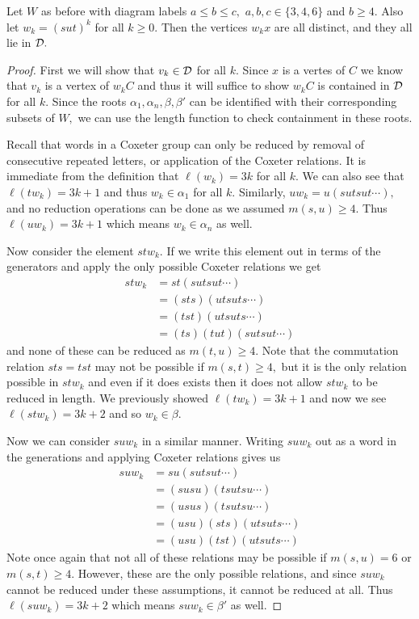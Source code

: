 \documentclass[class=book, crop=false,12 pt]{standalone}
\begin{document}
\begin{lemma}
	\label{infmany}
	Let $W$ as before with diagram labels $a\le b\le c,$ $a,b,c\in \{3,4,6\}$ and $b\ge 4.$ Also let $w_k=(sut)^k$ for all $k\ge 0.$ Then the vertices $w_kx$ are all distinct, and they all lie in $\mathcal{D}.$
\end{lemma}
\begin{proof}
	First we will show that $v_k\in \mathcal{D}$ for all $k.$ Since $x$ is a vertes of $C$ we know that $v_k$ is a vertex of $w_kC$ and thus it will suffice to show $w_kC$ is contained in $\mathcal{D}$ for all $k.$ Since the roots $\alpha_1,\alpha_n,\beta,\beta'$ can be identified with their corresponding subsets of $W,$ we can use the length function to check containment in these roots.

	Recall that words in a Coxeter group can only be reduced by removal of consecutive repeated letters, or application of the Coxeter relations. It is immediate from the definition that $\ell(w_k)=3k$ for all $k.$ We can also see that $\ell(tw_k)=3k+1$ and thus $w_k\in \alpha_1$ for all $k.$ Similarly, $uw_k=u(sutsut\cdots),$ and no reduction operations can be done as we assumed $m(s,u)\ge 4.$ Thus $\ell(uw_k)=3k+1$ which means $w_k\in \alpha_n$ as well.

	Now consider the element $stw_k.$ If we write this element out in terms of the generators and apply the only possible Coxeter relations we get
	\begin{align*}
		stw_k&=st(sutsut\cdots)\\
		     &=(sts)(utsuts\cdots)\\
		     &=(tst)(utsuts\cdots)\\
		     &=(ts)(tut)(sutsut\cdots)
	\end{align*}
	and none of these can be reduced as $m(t,u)\ge 4.$ Note that the commutation relation $sts=tst$ may not be possible if $m(s,t)\ge 4,$ but it is the only relation possible in $stw_k$ and even if it does exists then it does not allow $stw_k$ to be reduced in length. We previously showed $\ell(tw_k)=3k+1$ and now we see $\ell(stw_k)=3k+2$ and so $w_k\in \beta.$

	Now we can consider $suw_k$ in a similar manner. Writing $suw_k$ out as a word in the generations and applying Coxeter relations gives us
\begin{align*}
	suw_k&=su(sutsut\cdots)\\
	     &=(susu)(tsutsu\cdots)\\
	     &=(usus)(tsutsu\cdots)\\
	     &=(usu)(sts)(utsuts\cdots)\\
	     &=(usu)(tst)(utsuts\cdots)
\end{align*}
Note once again that not all of these relations may be possible if $m(s,u)=6$ or $m(s,t)\ge 4.$ However, these are the only possible relations, and since $suw_k$ cannot be reduced under these assumptions, it cannot be reduced at all. Thus $\ell(suw_k)=3k+2$ which means $suw_k\in \beta'$ as well.


\end{proof}
\end{document}

